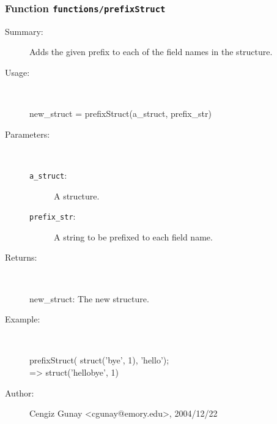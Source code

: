 \subsubsection[Function \texttt{prefixStruct}]{Function \texttt{functions/prefixStruct}}%
%
\label{ref_functions__prefixStruct}%
\hypertarget{ref_functions__prefixStruct}{}%
\begin{description}
\item[Summary:]Adds the given prefix to each of the field names in the structure.
%
\item[Usage:]~%
\begin{lyxcode}%
new\_struct = prefixStruct(a\_struct, prefix\_str)
%
\end{lyxcode}%
%
%
\item[Parameters:]~
\begin{description}%
\item[\texttt{a\_struct}:]
 A structure.
\item[\texttt{prefix\_str}:]
 A string to be prefixed to each field name.
\end{description}%
%
\item[Returns:
]~

 	new\_struct: The new structure.
%
\item[Example:]~
\begin{lyxcode} prefixStruct( struct('bye', 1), 'hello');
\\%
  => struct('hellobye', 1)
\\%
\end{lyxcode}
%
%
\item[Author:]%
Cengiz Gunay <cgunay@emory.edu>, 2004/12/22
%
\end{description}
\methodline%

